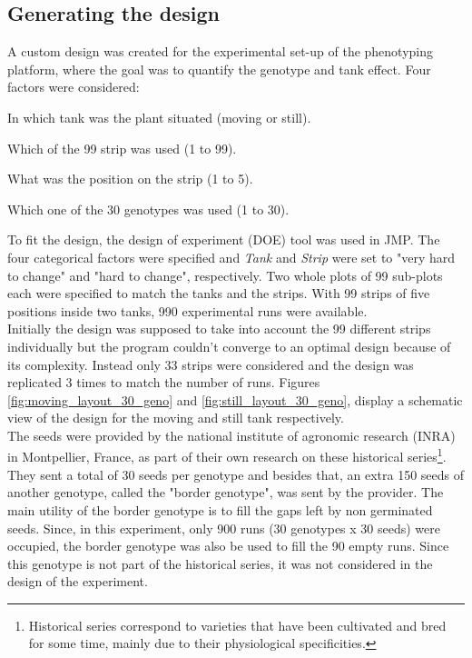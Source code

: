 \subsection{Generating the design}
A custom design was created for the experimental set-up of the phenotyping platform, where the goal was to quantify the genotype and tank effect. Four factors were considered:

\begin{description}[align=left]
\item [Tank] In which tank was the plant situated (moving or still).
\item [Strip] Which of the 99 strip was used (1 to 99).
\item [Position] What was the position on the strip (1 to 5).
\item [Genotype] Which one of the 30 genotypes was used (1 to 30).
\end{description}

To fit the design, the design of experiment (DOE) tool was used in JMP. The four categorical factors were specified and \textit{Tank} and \textit{Strip} were set to "very hard to change" and "hard to change", respectively. Two whole plots of 99 sub-plots each were specified to match the tanks and the strips. With 99 strips of five positions inside two tanks, 990 experimental runs were available.\\
Initially the design was supposed to take into account the 99 different strips individually but the program couldn't converge to an optimal design because of its complexity. Instead only 33 strips were considered and the design was replicated 3 times to match the number of runs. Figures \ref{fig:moving_layout_30_geno} and \ref{fig:still_layout_30_geno}, display a schematic view of the design for the moving and still tank respectively.\\
The seeds were provided by the national institute of agronomic research (INRA) in Montpellier, France, as part of their own research on these historical series\footnote{Historical series correspond to varieties that have been cultivated and bred for some time, mainly due to their physiological specificities.}. They sent a total of 30 seeds per genotype and besides that, an extra 150 seeds of another genotype, called the "border genotype", was sent by the provider. The main utility of the border genotype is to fill the gaps left by non germinated seeds. Since, in this experiment, only 900 runs (30 genotypes x 30 seeds) were occupied, the border genotype was also be used to fill the 90 empty runs. Since this genotype is not part of the historical series, it was not considered in the design of the experiment.


